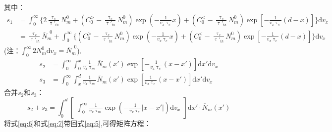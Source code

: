 \documentclass{article}
\begin{document}
	其中：
	\begin{equation}\label{eq:6}
		\begin{aligned}
			s_1&=\int_0^{\infty}\{2\frac{\uptau_c}{\uptau'_{th}}N_m^0+(C_0^>-\frac{\uptau_c}{\uptau'_{th}}N_m^0)\exp(-\frac{1}{v_x\uptau_c}x)+(C_0^<-\frac{\uptau_c}{\uptau'_{th}}N_m^0)\exp[-\frac{1}{v_x\uptau_c}(d-x)]\}\mathrm{d}v_x\\
			&=\frac{\uptau_c}{\uptau'_{th}}\overline{N}_m^{\phantom{0}0}+\int_0^{\infty}\{(C_0^>-\frac{\uptau_c}{\uptau'_{th}}N_m^0)\exp(-\frac{1}{v_x\uptau_c}x)+(C_0^<-\frac{\uptau_c}{\uptau'_{th}}N_m^0)\exp[-\frac{1}{v_x\uptau_c}(d-x)]\}\mathrm{d}v_x
		\end{aligned}
	\end{equation}
	\phantom{aaaaaaaaaaaaaaaaaaaaaaaaaaaaaaaaaaaaaaaaaaaaaaaaaaa}(注：$\displaystyle\int_0^{\infty}2N_m^0\mathrm{d}v_x=\overline{N}_m^{\phantom{0}0}$).
	\[
		\begin{aligned}
			s_2&=\int_0^{\infty}\int_0^x\frac{1}{v_x\uptau_m}\overline{N}_m(x')\exp[-\frac{1}{v_x\uptau_c}(x-x')]\mathrm{d}x'\mathrm{d}v_x	\\
			s_3&=\int_0^{\infty}\int_x^d\frac{1}{v_x\uptau_m}\overline{N}_m(x')\exp[\frac{1}{v_x\uptau_c}(x-x')]\mathrm{d}x'\mathrm{d}v_x	
		\end{aligned}
	\]
	合并$s_2$和$s_3$：
	\begin{equation}\label{eq:7}
		s_2+s_3=\int_0^d\begin{bmatrix}\displaystyle\int_0^{\infty}\frac{1}{v_x\uptau_m}\exp(-\frac{1}{v_x\uptau_c}|x-x'|)\mathrm{d}v_x\end{bmatrix}\mathrm{d}x'\cdot\overline{N}_m(x')
	\end{equation}
	将式\eqref{eq:6}和式\eqref{eq:7}带回式\eqref{eq:5},可得矩阵方程：
\end{document}
